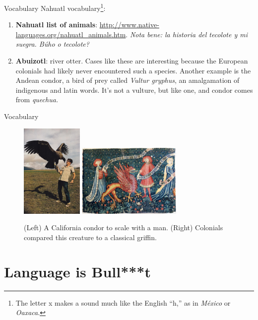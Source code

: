 \documentclass{beamer}
\begin{document}
\begin{frame}{Vocabulary}
\small
Nahuatl vocabulary\footnote{The letter x makes a sound much like the English ``h,'' as in \textit{M\'{e}xico} or \textit{Oaxaca}.}:
\begin{enumerate}
\item \textbf{Nahuatl list of animals}: \url{http://www.native-languages.org/nahuatl_animals.htm}. \textit{Nota bene: la historia del tecolote y mi suegra.  B\'{u}ho o tecolote?}
\item \textbf{Abuizotl}: river otter.  Cases like these are interesting because the European colonials had likely never encountered such a species.  Another example is the Andean condor, a bird of prey called \textit{Vultur gryphus}, an amalgamation of indigenous and latin words.  It's not a vulture, but like one, and condor comes from \textit{quechua.}
\end{enumerate}
\end{frame}

\begin{frame}{Vocabulary}
\begin{figure}
\centering
\includegraphics[width=3cm]{figures/condor.jpg}
\includegraphics[width=5cm]{figures/griff.png}
\caption{(Left) A California condor to scale with a man.  (Right) Colonials compared this creature to a classical griffin.}
\end{figure}
\end{frame}

\section{Language is Bull***t}
\end{document}
